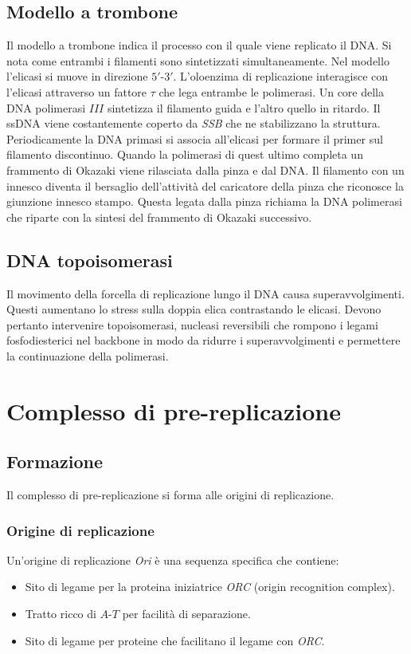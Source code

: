 	\subsection{Modello a trombone}
	Il modello a trombone indica il processo con il quale viene replicato il DNA.
	Si nota come entrambi i filamenti sono sintetizzati simultaneamente.
	Nel modello l'elicasi si muove in direzione $5'$-$3'$.
	L'oloenzima di replicazione interagisce con l'elicasi attraverso un fattore $\tau$ che lega entrambe le polimerasi.
	Un core della DNA polimerasi $III$ sintetizza il filamento guida e l'altro quello in ritardo.
	Il ssDNA viene costantemente coperto da \emph{SSB} che ne stabilizzano la struttura.
	Periodicamente la DNA primasi si associa all'elicasi per formare il primer sul filamento discontinuo.
	Quando la polimerasi di quest ultimo completa un frammento di Okazaki viene rilasciata dalla pinza e dal DNA.
	Il filamento con un innesco diventa il bersaglio dell'attivit\`a del caricatore della pinza che riconosce la giunzione innesco stampo.
	Questa legata dalla pinza richiama la DNA polimerasi che riparte con la sintesi del frammento di Okazaki successivo.

	\subsection{DNA topoisomerasi}
	Il movimento della forcella di replicazione lungo il DNA causa superavvolgimenti.
	Questi aumentano lo stress sulla doppia elica contrastando le elicasi.
	Devono pertanto intervenire topoisomerasi, nucleasi reversibili che rompono i legami fosfodiesterici nel backbone in modo da ridurre i superavvolgimenti e permettere la continuazione della polimerasi.

\section{Complesso di pre-replicazione}

	\subsection{Formazione}
	Il complesso di pre-replicazione si forma alle origini di replicazione.

		\subsubsection{Origine di replicazione}
		Un'origine di replicazione \emph{Ori} \`e una sequenza specifica che contiene:
		\begin{multicols}{2}
			\begin{itemize}
				\item Sito di legame per la proteina iniziatrice \emph{ORC} (origin recognition complex).
				\item Tratto ricco di $A$-$T$ per facilit\`a di separazione.
				\item Sito di legame per proteine che facilitano il legame con \emph{ORC}.
			\end{itemize}
		\end{multicols}

